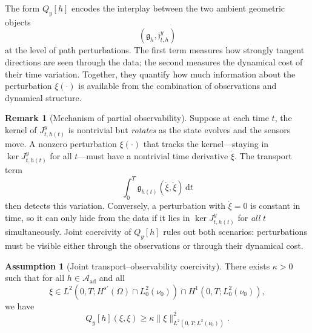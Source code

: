 \documentclass{article}
\theoremstyle{definition}
\newtheorem{remark}[theorem]{Remark}
\newtheorem{assumption}[theorem]{Assumption}
\renewcommand{\d}{\mathrm{d}}
\begin{document}
The form \(Q_y[h]\) encodes the interplay between the two ambient geometric objects
\[
    (\mathfrak g_h,\mathfrak j_{t,h}^{y})
\]
at the level of path perturbations. The first term measures how strongly tangent directions are seen
through the data; the second measures the dynamical cost of their time variation. Together, they
quantify how much information about the perturbation \(\xi(\cdot)\) is available from the
combination of observations and dynamical structure.

\begin{remark}[Mechanism of partial observability]
    \label{rem:partial-observability-mechanism}
    Suppose at each time \(t\), the kernel of \(J_{t,h(t)}^{y}\) is nontrivial but \emph{rotates} as the
    state evolves and the sensors move. A nonzero perturbation \(\xi(\cdot)\) that tracks the kernel---staying in
    \(\ker J_{t,h(t)}^{y}\) for all \(t\)---must have a nontrivial time derivative \(\dot\xi\). The
    transport term
    \[
        \int_0^T\mathfrak g_{h(t)}(\dot\xi,\dot\xi)\,\d t
    \]
    then detects this variation. Conversely, a perturbation with \(\dot\xi=0\) is constant in time, so
    it can only hide from the data if it lies in \(\ker J_{t,h(t)}^{y}\) for \emph{all} \(t\)
    simultaneously. Joint coercivity of \(Q_y[h]\) rules out both scenarios: perturbations must be
    visible either through the observations or through their dynamical cost.
\end{remark}

\begin{assumption}[Joint transport--observability coercivity]
    \label{ass:joint-transport-observability}
    There exists \(\kappa>0\) such that for all \(h\in \mathcal A_{\mathrm{ad}}\) and all
    \[
        \xi\in L^2(0,T;H^{s'}(\Omega)\cap L^2_0(\nu_0))
        \cap H^1(0,T;L^2_0(\nu_0)),
    \]
    we have
    \begin{equation}
        \label{eq:joint-coercivity}
        Q_y[h](\xi,\xi)
        \ge
        \kappa \|\xi\|_{L^2(0,T;L^2(\nu_0))}^2.
    \end{equation}
\end{assumption}
\end{document}

